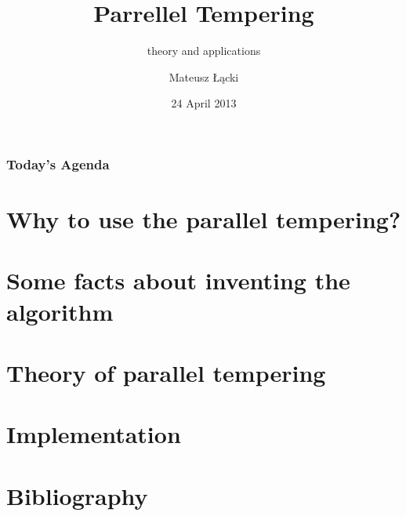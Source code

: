 \documentclass[xetex]{beamer}
\title[Parrellel Tempering]{Parrellel Tempering }
\subtitle{theory and applications}
\date{24 April 2013}
\author[Łącki]{Mateusz Łącki}
\institute[UW]{Uniwersytet Warszawski}
\begin{document}


	\begin{frame}
		\titlepage
	\end{frame}

	\begin{frame}
		\frametitle{Today's Agenda}
		\tableofcontents
	\end{frame}
	

	\section[Why bother?]{Why to use the parallel tempering?}
	
	\section[History]{Some facts about inventing the algorithm}

	\section[History]{Theory of parallel tempering}

	\section[History]{Implementation}

	\section[Sources]{Bibliography}
		

\end{document}
